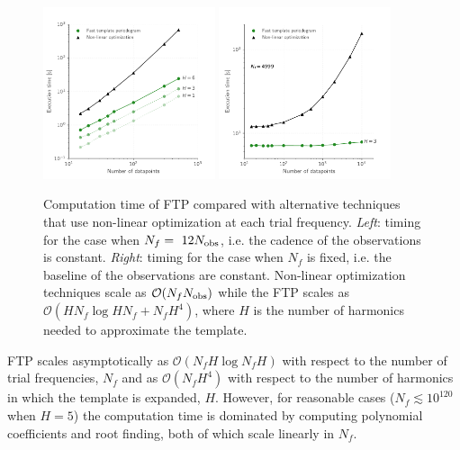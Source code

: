 \documentclass[apj]{emulateapj}
\newcommand{\bigO}{\mathcal{O}}
\begin{document}
\begin{figure}
    \centering
    \includegraphics[width=0.45\textwidth]{plots/timing_vs_ndata.pdf}
    \includegraphics[width=0.45\textwidth]{plots/timing_vs_ndata_const_freq.pdf}
    \caption{\label{fig:timingndata} Computation time of FTP compared with alternative techniques
             that use non-linear optimization at each trial frequency. \emph{Left}: timing for the
             case when $N_f = ~12 N_{\rm obs}$, i.e. the cadence of the observations is constant. 
             \emph{Right}: timing for the case when $N_f$ is fixed, i.e. the baseline of the observations
             are constant. Non-linear optimization techniques scale as $\bigO(N_f N_{\rm obs})$ while 
             the FTP scales as $\bigO(HN_f\log HN_f + N_fH^4)$, where $H$ is the number of harmonics
             needed to approximate the template.}
    
\end{figure}

FTP scales asymptotically as $\bigO(N_fH\log N_fH)$ with respect to the number of trial frequencies,
$N_f$ and as $\bigO(N_fH^4)$ with respect to the number of harmonics in which the template is expanded, $H$.
However, for reasonable cases ($N_f \lesssim 10^{120}$ when $H=5$) the computation time is dominated by
computing polynomial coefficients and root finding, both of which scale linearly in $N_f$. 
\end{document}
